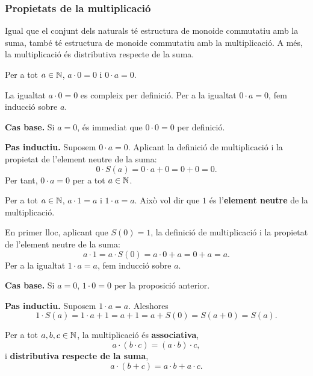 \subsubsection{Propietats de la multiplicació}

Igual que el conjunt dels naturals té estructura de monoide commutatiu amb la suma, també té estructura de monoide commutatiu amb la multiplicació. A més, la multiplicació és distributiva respecte de la suma.

\begin{proposicio}
Per a tot $a\in \mathbb{N}$, $a\cdot 0=0$ i $0\cdot a=0$.
\end{proposicio}

\begin{prova}
La igualtat $a\cdot 0=0$ es compleix per definició. Per a la igualtat $0\cdot a=0$, fem inducció sobre $a$.

\textbf{Cas base.} Si $a=0$, és immediat que $0\cdot 0=0$ per definició.

\textbf{Pas inductiu.} Suposem $0\cdot a=0$. Aplicant la definició de multiplicació i la propietat de l'element neutre de la suma:
\[
0\cdot S(a)=0\cdot a+0=0+0=0.
\]
Per tant, $0\cdot a=0$ per a tot $a\in \mathbb{N}$.
\end{prova}

\begin{proposicio}
Per a tot $a\in \mathbb{N}$, $a\cdot 1=a$ i $1\cdot a=a$. Això vol dir que $1$ és l'\textbf{element neutre} de la multiplicació.
\end{proposicio}

\begin{prova}
En primer lloc, aplicant que $S(0)=1$, la definició de multiplicació i la propietat de l'element neutre de la suma:
\[
a\cdot 1=a\cdot S(0)=a\cdot 0+a=0+a=a.
\]
Per a la igualtat $1\cdot a=a$, fem inducció sobre $a$.

\textbf{Cas base.} Si $a=0$, $1\cdot 0=0$ per la proposició anterior.

\textbf{Pas inductiu.} Suposem $1\cdot a=a$. Aleshores
\[
1\cdot S(a)=1\cdot a+1=a+1=a+S(0)=S(a+0)=S(a).
\]
\end{prova}

\begin{proposicio}
Per a tot $a,b,c\in \mathbb{N}$, la multiplicació és \textbf{associativa},
\[
a\cdot (b\cdot c)=(a\cdot b)\cdot c,
\]
i \textbf{distributiva respecte de la suma},
\[
a\cdot (b+c)=a\cdot b+a\cdot c.
\]
\end{proposicio}

